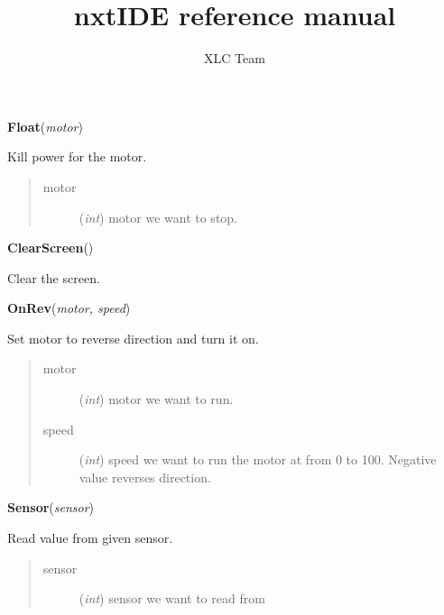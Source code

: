 \documentclass[10pt,a4paper]{article}
\title{nxtIDE reference manual}
\author{XLC Team}
\date{}
\begin{document}
\maketitle

\vspace{6pt}
{\bf Float}({\it motor}) 
    
    Kill power for the motor.





\begin{quote}
    \begin{description}
        
\item[motor] ({\emph{int}}) motor we want to stop.

    \end{description}
\end{quote}

 

\vspace{6pt}
{\bf ClearScreen}({\it }) 
    
    Clear the screen.


 

\vspace{6pt}
{\bf OnRev}({\it motor, speed}) 
    
    Set motor to reverse direction and turn it on.
    





\begin{quote}
    \begin{description}
        
\item[motor] ({\emph{int}}) motor we want to run.

\item[speed] ({\emph{int}}) speed we want to run the motor at from 0 to 100. Negative value reverses direction.

    \end{description}
\end{quote}

 

\vspace{6pt}
{\bf Sensor}({\it sensor}) 
    
    Read value from given sensor.
    




\begin{quote}
    \begin{description}
        
\item[sensor] ({\emph{int}}) sensor we want to read from

    \end{description}
\end{quote}
\end{document}

